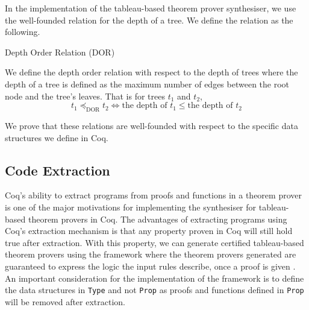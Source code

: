 \documentclass{llncs}
\newcommand{\comment}[1]{}
\begin{document}
In the implementation of the tableau-based theorem prover synthesiser, we use
the well-founded relation for the depth of a tree. We define the relation as
the following.
%
\comment{
we use
two main well-founded relations to define general recursive functions: the
length order of a list and the depth order of a tree like data structure.
We define the relations as the following.

\begin{definition}{Length Order Relation (LOR)}

We define the length order relation with respect to the length of lists.
That is for lists $l_1$ and $l_2$,

\begin{equation}
l_1 \preceq_{\textrm{LOR}} l_2 \iff \textrm{the
length of } l_1 \le \textrm{the length of } l_2
\label{lengthOrder}
\end{equation}
\end{definition}
}
%
\begin{definition}{Depth Order Relation (DOR)}

We define the depth order relation with respect to the depth of trees where the
depth of a tree is defined as the maximum number of edges between the root node
and the tree's leaves.
That is for trees $t_1$ and $t_2$,
%
\begin{equation}
t_1 \preceq_{\textrm{DOR}} t_2 \iff \textrm{the
depth of } t_1 \leq \textrm{the depth of } t_2
\label{depthOrder}
\end{equation}
\end{definition}
%
We prove that these relations are well-founded with respect to the specific
data structures we define in Coq.
%
\subsection{Code Extraction}
%
Coq's ability to extract programs from proofs and functions in a theorem prover
is one of the major motivations for implementing the synthesiser for
tableau-based theorem provers in Coq. The advantages of extracting programs
using Coq's extraction mechanism is that any property proven in Coq will still
hold true after extraction. With this property, we can generate certified
tableau-based theorem provers using the framework where the theorem provers
generated are guaranteed to express the logic the input rules describe, once
a proof is given \cite{letouzey2008extraction}. An important consideration for
the implementation of the framework is to define the data structures in
\verb+Type+ and not \verb+Prop+ as proofs and functions defined in \verb+Prop+
will be removed after extraction.
%
\end{document}
